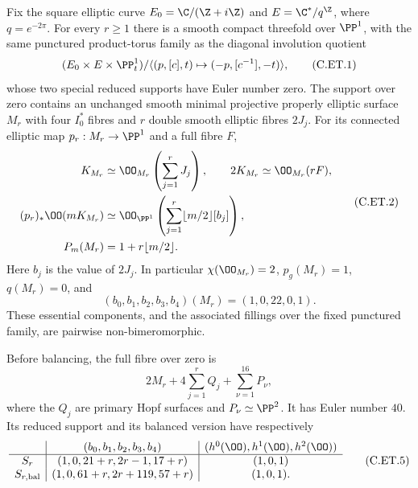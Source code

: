 
\begin{proposition}\label{cdp:st:C.2.UN.30}
Fix the square elliptic curve
$E_0=\C/(\Z+i\Z)$ and $E=\C^*/q^{\Z}$,
where $q=e^{-2\pi}$. For every $r\ge1$ there is
a smooth compact threefold over $\PP^1$,
with the same punctured product-torus family
as the diagonal involution quotient
\[
 (E_0\times E\times\PP^1_t)/
      \langle(p,[c],t)\mapsto(-p,[c^{-1}],-t)\rangle,
                                                               \tag{C.ET.1}\label{cdp:eq:C.ET.1}
\]
whose two special reduced supports have Euler
number zero. The support over zero contains an
unchanged smooth minimal projective properly
elliptic surface $M_r$ with four $I_0^*$ fibres
and $r$ double smooth elliptic fibres $2J_j$.
For its connected elliptic map $p_r:M_r\to\PP^1$
and a full fibre $F$,
\[
 \begin{aligned}
 K_{M_r}&\simeq\OO_{M_r}\left(\sum_{j=1}^rJ_j\right),
 \qquad 2K_{M_r}\simeq\OO_{M_r}(rF),\\
 (p_r)_*\OO(mK_{M_r})
   &\simeq\OO_{\PP^1}\left(
                \sum_{j=1}^r\lfloor m/2\rfloor[b_j]\right),
 \\
 P_m(M_r)&=1+r\lfloor m/2\rfloor .
 \end{aligned}                                             \tag{C.ET.2}\label{cdp:eq:C.ET.2}
\]
Here $b_j$ is the value of $2J_j$. In particular
$\chi(\OO_{M_r})=2$, $p_g(M_r)=1$, $q(M_r)=0$,
and
\[
            (b_0,b_1,b_2,b_3,b_4)(M_r)
                         =(1,0,22,0,1).              \tag{C.ET.3}\label{cdp:eq:C.ET.3}
\]
These essential components, and the associated
fillings over the fixed punctured family, are
pairwise non-bimeromorphic.

Before balancing, the full fibre over zero is
\[
                  2M_r+4\sum_{j=1}^rQ_j
                           +\sum_{\nu=1}^{16}P_\nu,
                                                               \tag{C.ET.4}\label{cdp:eq:C.ET.4}
\]
where the $Q_j$ are primary Hopf surfaces and
$P_\nu\simeq\PP^2$. It has Euler number $40$.
Its reduced support and its balanced version
have respectively
\[
 \begin{array}{c|c|c}
 &(b_0,b_1,b_2,b_3,b_4)&
                 (h^0(\OO),h^1(\OO),h^2(\OO))\\ \hline
 S_r&(1,0,21+r,2r-1,17+r)&(1,0,1)\\
 S_{r,\mathrm{bal}}&(1,0,61+r,2r+119,57+r)&(1,0,1).
 \end{array}                                             \tag{C.ET.5}\label{cdp:eq:C.ET.5}
\]
\end{proposition}
